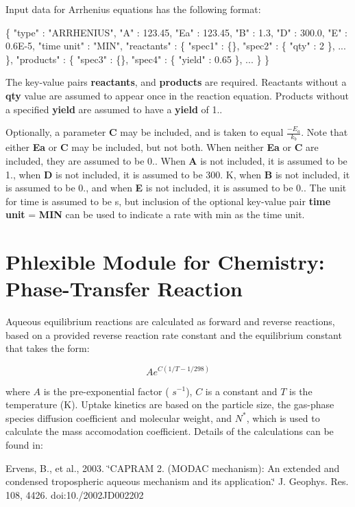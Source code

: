 Input data for Arrhenius equations has the following format\+: 
\begin{DoxyCode}
\{
  "type" : "ARRHENIUS",
  "A" : 123.45,
  "Ea" : 123.45,
  "B"  : 1.3,
  "D"  : 300.0,
  "E"  : 0.6E-5,
  "time unit" : "MIN",
  "reactants" : \{
    "spec1" : \{\},
    "spec2" : \{ "qty" : 2 \},
    ...
  \},
  "products" : \{
    "spec3" : \{\},
    "spec4" : \{ "yield" : 0.65 \},
    ...
  \}
\}
\end{DoxyCode}
 The key-\/value pairs {\bfseries reactants}, and {\bfseries products} are required. Reactants without a {\bfseries qty} value are assumed to appear once in the reaction equation. Products without a specified {\bfseries yield} are assumed to have a {\bfseries yield} of 1..

Optionally, a parameter {\bfseries C} may be included, and is taken to equal $\frac{-E_a}{k_b}$. Note that either {\bfseries Ea} or {\bfseries C} may be included, but not both. When neither {\bfseries Ea} or {\bfseries C} are included, they are assumed to be 0.. When {\bfseries A} is not included, it is assumed to be 1., when {\bfseries D} is not included, it is assumed to be 300. K, when {\bfseries B} is not included, it is assumed to be 0., and when {\bfseries E} is not included, it is assumed to be 0.. The unit for time is assumed to be s, but inclusion of the optional key-\/value pair {\bfseries time} {\bfseries unit} = {\bfseries M\+IN} can be used to indicate a rate with min as the time unit. \hypertarget{phlex_rxn_aqueous_equilibrium}{}\section{Phlexible Module for Chemistry\+: Phase-\/\+Transfer Reaction}\label{phlex_rxn_aqueous_equilibrium}
Aqueous equilibrium reactions are calculated as forward and reverse reactions, based on a provided reverse reaction rate constant and the equilibrium constant that takes the form\+:

\[ Ae^{C({1/T-1/298})} \]

where $A$ is the pre-\/exponential factor ( $s^{-1}$), $C$ is a constant and $T$ is the temperature (K). Uptake kinetics are based on the particle size, the gas-\/phase species diffusion coefficient and molecular weight, and $N^{*}$, which is used to calculate the mass accomodation coefficient. Details of the calculations can be found in\+:

Ervens, B., et al., 2003. \char`\"{}\+C\+A\+P\+R\+A\+M 2. (\+M\+O\+D\+A\+C mechanism)\+: An extended
 and condensed tropospheric aqueous mechanism and its application.\char`\"{} J. Geophys. Res. 108, 4426. doi\+:10./2002\+J\+D002202

